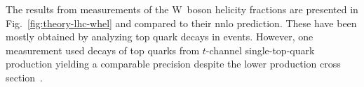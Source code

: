 
The results from measurements of the $\mathrm{W}$~boson helicity fractions are presented in Fig.~\ref{fig:theory-lhc-whel} and compared to their \gls{nnlo} prediction. These have been mostly obtained by analyzing top quark decays in \ttbar events. However, one measurement used decays of top quarks from $t$-channel single-top-quark production yielding a comparable precision despite the lower production cross section~\cite{Khachatryan:2014vma}.

